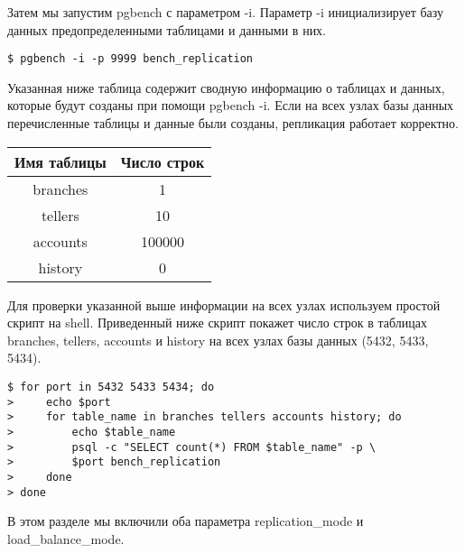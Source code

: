 Затем мы запустим pgbench с параметром -i. Параметр -i инициализирует базу данных предопределенными 
таблицами и данными в них.
\begin{verbatim}
$ pgbench -i -p 9999 bench_replication
\end{verbatim}

Указанная ниже таблица содержит сводную информацию о таблицах и данных, которые будут созданы при помощи pgbench -i. 
Если на всех узлах базы данных перечисленные таблицы и данные были созданы, репликация работает корректно.

\begin{tabular}{ | c | c | }
  \hline
  Имя таблицы & Число строк \\
  \hline
  branches & 1 \\
  \hline
  tellers & 10 \\
  \hline
  accounts & 100000 \\
  \hline
  history & 0 \\
  \hline
\end{tabular}

Для проверки указанной выше информации на всех узлах используем простой скрипт на shell. 
Приведенный ниже скрипт покажет число строк в таблицах branches, tellers, accounts и history 
на всех узлах базы данных (5432, 5433, 5434).
\begin{verbatim}
$ for port in 5432 5433 5434; do
>     echo $port
>     for table_name in branches tellers accounts history; do
>         echo $table_name
>         psql -c "SELECT count(*) FROM $table_name" -p \
>         $port bench_replication
>     done
> done
\end{verbatim}

В этом разделе мы включили оба параметра replication\_mode и load\_balance\_mode.

